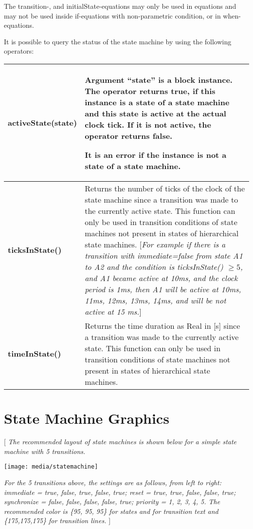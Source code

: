 The transition-, and initialState-equations may only be used in
equations and may not be used inside if-equations with non-parametric
condition, or in when-equations.

It is possible to query the status of the state machine by using the
following operators:

\begin{longtable}[]{|p{4cm}|p{10cm}|}
\hline \endhead
\textbf{activeState}(state)&
Argument ``state'' is a block instance. The operator returns
\textbf{true}, if this instance is a state of a state machine and this
state is active at the actual clock tick. If it is not active, the
operator returns \textbf{false}.

It is an error if the instance is not a state of a state machine.\\ \hline
\textbf{ticksInState()} & Returns the number of ticks of the clock of
the state machine since a transition was made to the currently active
state. This function can only be used in transition conditions of state
machines not present in states of hierarchical state machines.
{[}\emph{For example if there is a transition with immediate=false from
state A1 to A2 and the condition is ticksInState() $\ge 5$, and A1 became
active at 10ms, and the clock period is 1ms, then A1 will be active at
10ms, 11ms, 12ms, 13ms, 14ms, and will be not active at 15 ms.}{]}\\ \hline
\textbf{timeInState()} & Returns the time duration as Real in {[}s{]}
since a transition was made to the currently active state. This function
can only be used in transition conditions of state machines not present
in states of hierarchical state machines.\\ \hline

\end{longtable}

\section{State Machine Graphics}

{[} \emph{The recommended layout of state machines is shown below for a
simple state machine with 5 transitions. }

\texttt{[image: media/statemachine]}

\emph{For
the 5 transitions above, the settings are as follows, from left to
right: immediate = true, false, true, false, true; reset = true, true,
false, false, true; synchronize = false, false, false, false, true;
priority = 1, 2, 3, 4, 5. The recommended color is \{95, 95, 95\} for
states and for transition text and \{175,175,175\} for transition
lines.} {]}

